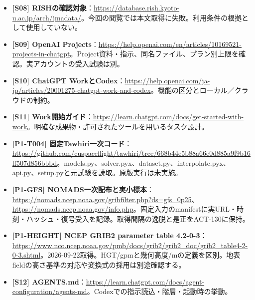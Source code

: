 \documentclass[11pt,a4paper]{article}
\begin{document}
\begin{itemize}
  \textbf{{[}S07{]}
  国土地理院}：\url{https://maps.gsi.go.jp/development/siyou.html}、\url{https://maps.gsi.go.jp/development/ichiran.html}。タイル仕様・一覧。個別採用条件は未確定。
\item
  \textbf{{[}S08{]}
  RISHの確認対象}：\url{https://database.rish.kyoto-u.ac.jp/arch/jmadata/}。今回の閲覧では本文取得に失敗。利用条件の根拠として使用していない。
\item
  \textbf{{[}S09{]} OpenAI
  Projects}：\url{https://help.openai.com/en/articles/10169521-projects-in-chatgpt}。Project資料・指示、同名ファイル、プラン別上限を確認。実アカウントの受入試験は別。
\item
  \textbf{{[}S10{]} ChatGPT
  WorkとCodex}：\url{https://help.openai.com/ja-jp/articles/20001275-chatgpt-work-and-codex}。機能の区分とローカル／クラウドの制約。
\item
  \textbf{{[}S11{]}
  Work開始ガイド}：\url{https://learn.chatgpt.com/docs/get-started-with-work}。明確な成果物・許可されたツールを用いるタスク設計。
\item
  \textbf{{[}P1-T004{]}
  固定Tawhiri一次コード}：\url{https://github.com/cuspaceflight/tawhiri/tree/668b44e5b88a66e0d885a9f9b16ff507d856bbbd}。models.py、solver.pyx、dataset.py、interpolate.pyx、api.py、setup.pyと元試験を読取。原版実行は未実施。
\item
  \textbf{{[}P1-GFS{]}
  NOMADS一次配布と実小標本}：\url{https://nomads.ncep.noaa.gov/gribfilter.php?ds=gfs_0p25}、\url{https://nomads.ncep.noaa.gov/info.php}。固定入力のmanifestに実URL・時刻・ハッシュ・復号受入を記録。取得間隔の逸脱と是正をACT-130に保持。
\item
  \textbf{{[}P1-HEIGHT{]} NCEP GRIB2 parameter table
  4.2-0-3}：\url{https://www.nco.ncep.noaa.gov/pmb/docs/grib2/grib2_doc/grib2_table4-2-0-3.shtml}。2026-09-22取得。HGT/gpmと幾何高度/mの定義を区別。地表fieldの高さ基準の対応や変換式の採用は別途確認する。
\item
  \textbf{{[}S12{]}
  AGENTS.md}：\url{https://learn.chatgpt.com/docs/agent-configuration/agents-md}。Codexでの指示読込・階層・起動時の挙動。
\end{itemize}
\end{document}

